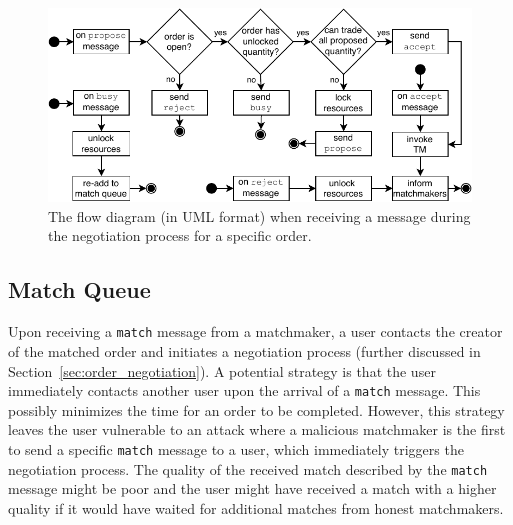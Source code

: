 


\begin{figure}[t]
	\centering
	\includegraphics[width=\linewidth]{match/assets/negotiation_diagram}
	\caption{The flow diagram (in UML format) when receiving a message during the negotiation process for a specific order.}
	\label{fig:order_negotiation_diagram}
\end{figure}

\subsection{Match Queue}
\label{sec:match_queue}
Upon receiving a \texttt{match} message from a matchmaker, a user contacts the creator of the matched order and initiates a negotiation process (further discussed in Section~\ref{sec:order_negotiation}).
A potential strategy is that the user immediately contacts another user upon the arrival of a \texttt{match} message.
This possibly minimizes the time for an order to be completed.
However, this strategy leaves the user vulnerable to an attack where a malicious matchmaker is the first to send a specific \texttt{match} message to a user, which immediately triggers the negotiation process.
The quality of the received match described by the \texttt{match} message might be poor and the user might have received a match with a higher quality if it would have waited for additional matches from honest matchmakers.

